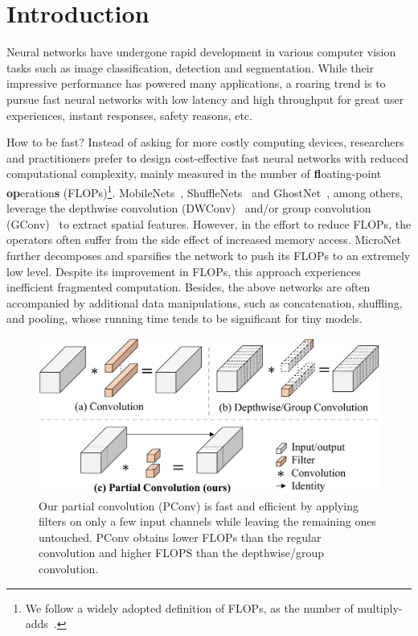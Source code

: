 \section{Introduction}
\label{sec:intro}

Neural networks have undergone rapid development in various computer vision tasks such as image classification, detection and segmentation. While their impressive performance has powered many applications, a roaring trend is to pursue fast neural networks with low latency and high throughput for great user experiences, instant responses, safety reasons, etc.

How to be fast? Instead of asking for more costly computing devices, researchers and practitioners prefer to design cost-effective fast neural networks with reduced computational complexity, mainly measured in the number of {\bf fl}oating-point {\bf op}eration{\bf s} (FLOPs)\footnote{We follow a widely adopted definition of FLOPs, as the number of multiply-adds~\cite{zhang2018shufflenet,liu2022convnet}.}. MobileNets~\cite{howard2017mobilenets,sandler2018mobilenetv2,howard2019searching},
ShuffleNets~\cite{zhang2018shufflenet,ma2018shufflenet} and GhostNet~\cite{han2020ghostnet}, among others, leverage the depthwise convolution (DWConv)~\cite{sifre2014rigid} and/or group convolution (GConv)~\cite{krizhevsky2012imagenet} to extract spatial features. However, in the effort to reduce FLOPs, the operators often suffer from the side effect of increased memory access. MicroNet~\cite{li2021micronet} further decomposes and sparsifies the network to push its FLOPs to an extremely low level. Despite its improvement in FLOPs, this approach experiences inefficient fragmented computation. Besides, the above networks are often accompanied by additional data manipulations, such as concatenation, shuffling, and pooling, whose running time tends to be significant for tiny models.

\begin{figure}
    \centering
    \includegraphics[width=1\linewidth]{figures/PConv-cropped.pdf}
    \vspace{-0.2in}
    \caption{Our partial convolution (PConv) is fast and efficient by applying filters on only a few input channels while leaving the remaining ones untouched. PConv obtains lower FLOPs than the regular convolution and higher FLOPS than the depthwise/group convolution.}
    \label{fig: PConv}
    \vspace{-0.05in}
\end{figure}

